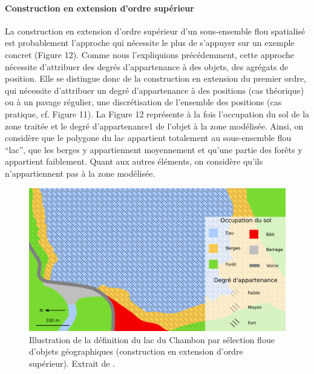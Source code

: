 \paragraph{Construction en extension d'ordre supérieur}

La construction en extension d’ordre supérieur d’un sous-ensemble flou
spatialisé est probablement l’approche qui nécessite le plus de
s’appuyer sur un exemple concret (Figure 12). Comme nous l’expliquions
précédemment, cette approche nécessite d’attribuer des degrés
d’appartenance à des objets, des agrégats de position. Elle se
distingue donc de la construction en extension du premier ordre, qui
nécessite d’attribuer un degré d’appartenance à des positions (cas
théorique) ou à un pavage régulier, une discrétisation de l’ensemble
des positions (cas pratique, cf. Figure 11). La Figure 12 représente à
la fois l’occupation du sol de la zone traitée et le degré
d’appartenance1 de l’objet à la zone modélisée. Ainsi, on considère
que le polygone du lac appartient totalement au sous-ensemble flou
“lac”, que les berges y appartiennent moyennement et qu’une partie des
forêts y appartient faiblement. Quant aux autres éléments, on
considère qu’ils n’appartiennent pas à la zone modélisée.

\begin{figure}
  \centering
  \includegraphics{../figures/fig12.png}
  \caption{Illustration de la définition du lac du Chambon par
    sélection floue d’objets géographiques (\ie construction en
    extension d’ordre supérieur). Extrait de \textcite{Bunel2020}.}
  \label{fig:champ_raster_sel}
\end{figure}

